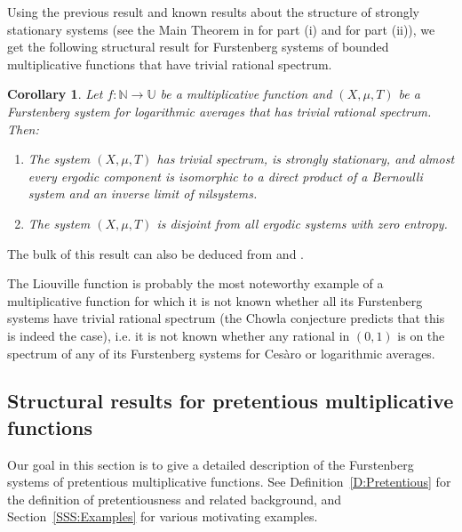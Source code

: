 \documentclass[11pt]{amsart}
\newtheorem{corollary}[lemma]{Corollary}
\theoremstyle{definition}
\newcommand{\N}{{\mathbb N}}
\newcommand{\U}{{\mathbb U}}
\begin{document}
 Using the previous result and known results about the structure of strongly stationary systems (see the Main Theorem in \cite{Fr04} for part (i) and \cite[part~(ii) of Proposition~3.12]{FH18} for part (ii)), we get the following structural result for Furstenberg systems of bounded multiplicative functions that have trivial rational spectrum.
 \begin{corollary}\label{C:sst}
 	Let  $f\colon \N\to \U$  be a multiplicative function and   $(X,\mu,T)$ be a Furstenberg system     for logarithmic averages
 	that has trivial rational spectrum. Then:
 	\begin{enumerate}
 		\item The system $(X,\mu,T)$  has trivial spectrum,  is strongly stationary,  and almost every ergodic component is isomorphic to a direct product of a Bernoulli system and an inverse limit of nilsystems.
 		
 		\smallskip
 		
 		\item The system $(X,\mu,T)$ is disjoint from all  ergodic systems with zero entropy.
 	\end{enumerate}
 \end{corollary}
The bulk of this  result can also be deduced from  \cite[part~(ii) of Proposition~3.12]{FH18}  and  \cite[Theorem~1.5]{FH21}.

 The Liouville function is probably the most noteworthy example of a multiplicative function for which
 it is not known whether all its Furstenberg systems have trivial rational spectrum (the Chowla conjecture predicts that this is indeed the case), i.e.  it is  not known whether any  rational in $(0,1)$ is on the  spectrum
of any of its  Furstenberg systems for Ces\`aro or logarithmic averages.


 	\subsection{Structural results for pretentious multiplicative functions }
 	Our goal in this section is to give  a detailed description of the Furstenberg systems of  pretentious multiplicative functions. See Definition~\ref{D:Pretentious} for the definition of pretentiousness and related background, and  Section~\ref{SSS:Examples} for various motivating examples.
\end{document}
